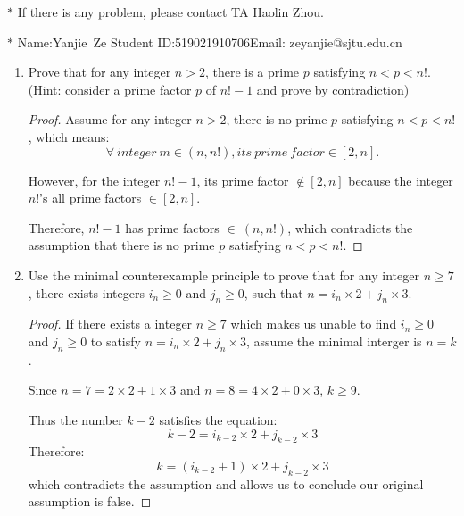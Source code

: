 \documentclass[12pt,a4paper]{article}
\theoremstyle{definition}
\begin{document}
\noindent

\noindent{}
\begin{center}
\footnotesize{\color{red}$*$ If there is any problem, please contact TA Haolin Zhou.}

\footnotesize{\color{blue}$*$ Name:Yanjie\ Ze \quad Student ID:519021910706\quad Email: zeyanjie@sjtu.edu.cn}
\end{center}

\begin{enumerate}
    \item
    Prove that for any integer $n>2$, there is a prime $p$ satisfying $n<p<n!$. {\color{blue}(Hint: consider a prime factor $p$ of $n!-1$ and prove by contradiction)}
    
 \begin{proof}
Assume for any integer $n>2$, there is no prime $p$ satisfying  $n<p<n!$, which means:
$$  \forall \  integer\ m \in (n, n!), its\ prime\ factor \in [2, n].$$

However, for the integer $n!-1$, its prime factor $\notin [2, n]$ because the integer $n!$'s all prime factors $\in [2, n]$. 

Therefore, $n!-1$ has prime factors $\in \ (n,n!)$, which contradicts the assumption that there is no prime $p$ satisfying  $n<p<n!$.
 \end{proof}

    \item
    Use the minimal counterexample principle to prove that for any integer $n\ge 7$, there exists integers $i_n\ge 0$ and $j_n\ge 0$, such that $n = i_n \times 2 + j_n \times 3$.
\begin{proof}
If there exists a integer $n\geq7$ which makes us unable to find $i_n\geq0$ and $j_n\geq0$ to satisfy $n=i_n\times2+j_n\times3$, assume the minimal interger is $n=k$.

Since $n=7=2\times2+1\times3$ and $n=8=4\times2+0\times3$, $k\geq9$.

Thus the number $k-2$ satisfies the equation: 
$$k-2=i_{k-2}\times2+j_{k-2}\times3$$
Therefore:
$$k=(i_{k-2}+1)\times2+j_{k-2}\times3$$
which contradicts the assumption and allows us to conclude our original assumption is false.


\end{proof}
\end{enumerate}
\end{document}
